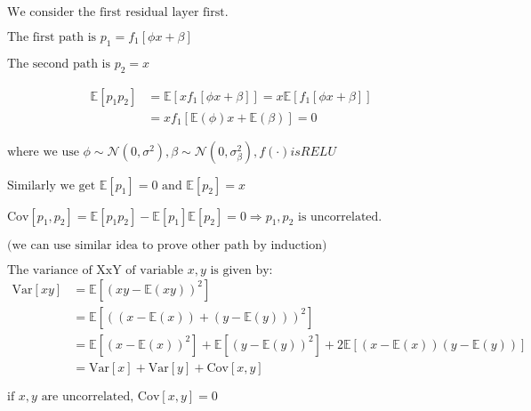 \documentclass{article}
\begin{document}

$\text{We consider the first residual layer first.}$

$\text{The first path is } p_1 = f_1[\phi x + \beta]$

$\text{The second path is } p_2 = x$

\begin{align*}
\mathbb{E}[p_1 p_2] &= \mathbb{E}[x f_1[\phi x + \beta]] = x \mathbb{E}[f_1[\phi x + \beta]] \\
&= x f_1[\mathbb{E}(\phi) x + \mathbb{E}(\beta)] = 0
\end{align*}

$\text{where we use } \phi \sim \mathcal{N}(0, \sigma^2), \beta \sim \mathcal{N}(0, \sigma_\beta^2) , f(\cdot) is RELU$

$\text{Similarly we get } \mathbb{E}[p_1] = 0 \text{ and } \mathbb{E}[p_2] = x$

$\text{Cov}[p_1, p_2] = \mathbb{E}[p_1 p_2] - \mathbb{E}[p_1] \mathbb{E}[p_2] = 0 \Rightarrow p_1, p_2 \text{ is uncorrelated.}$

$\text{(we can use similar idea to prove other path by induction)}$

\vspace{10pt}

$\text{The variance of XxY of variable } x, y \text{ is given by:}$
\begin{align*}
\text{Var}[xy] &= \mathbb{E}[(xy - \mathbb{E}(xy))^2] \\
&= \mathbb{E}[((x-\mathbb{E}(x)) + (y-\mathbb{E}(y)))^2] \\
&= \mathbb{E}[(x-\mathbb{E}(x))^2] + \mathbb{E}[(y-\mathbb{E}(y))^2] + 2\mathbb{E}[(x-\mathbb{E}(x)) (y-\mathbb{E}(y))] \\
&= \text{Var}[x] + \text{Var}[y] + \text{Cov}[x,y]
\end{align*}

$\text{if } x, y \text{ are uncorrelated, Cov}[x,y] = 0$
\end{document}
